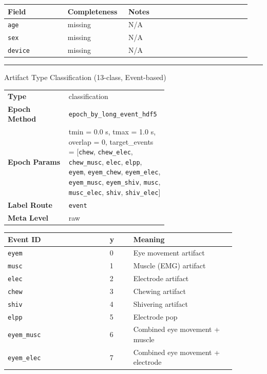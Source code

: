 {\begin{tcolorbox}
\begin{tabular}{@{}p{0.2350\linewidth}p{0.2350\linewidth}p{0.4700\linewidth}@{}}
\toprule
\textbf{Field} & \textbf{Completeness} & \textbf{Notes} \\
\midrule
\texttt{age} & missing & N/A \\
\texttt{sex} & missing & N/A \\
\texttt{device} & missing & N/A \\
\bottomrule
\end{tabular}
\endgroup
\noindent\rule{\linewidth}{0.7pt}\par\nopagebreak
{}
 {\footnotesize Artifact Type Classification (13-class, Event-based)}\par\smallskip
{\footnotesize\begin{tabular}{@{}lp{0.62\linewidth}@{}}
\textbf{Type} & classification \\
\textbf{Epoch Method} & \texttt{epoch\_by\_long\_event\_hdf5} \\
\textbf{Epoch Params} & tmin = 0.0 s, tmax = 1.0 s, overlap = 0, target\_events = [\texttt{chew}, \texttt{chew\_elec}, \texttt{chew\_musc}, \texttt{elec}, \texttt{elpp}, \texttt{eyem}, \texttt{eyem\_chew}, \texttt{eyem\_elec}, \texttt{eyem\_musc}, \texttt{eyem\_shiv}, \texttt{musc}, \texttt{musc\_elec}, \texttt{shiv}, \texttt{shiv\_elec}] \\
\textbf{Label Route} & \texttt{event} \\
\textbf{Meta Level} & raw \\
\end{tabular}}
\par{}\par\smallskip
\begingroup\footnotesize
\begin{tabular}{@{}p{0.3911\linewidth}p{0.0978\linewidth}p{0.3911\linewidth}@{}}
\toprule
\textbf{Event ID} & \textbf{y} & \textbf{Meaning} \\
\midrule
\texttt{eyem} & 0 & Eye movement artifact \\
\texttt{musc} & 1 & Muscle (EMG) artifact \\
\texttt{elec} & 2 & Electrode artifact \\
\texttt{chew} & 3 & Chewing artifact \\
\texttt{shiv} & 4 & Shivering artifact \\
\texttt{elpp} & 5 & Electrode pop \\
\texttt{eyem\_musc} & 6 & Combined eye movement + muscle \\
\texttt{eyem\_elec} & 7 & Combined eye movement + electrode \\

\end{tabular}
\end{tcolorbox}}
